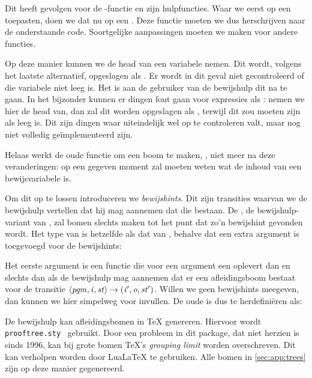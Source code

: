 Dit heeft gevolgen voor de -functie en zijn hulpfuncties. Waar we
eerst  op een  toepasten, doen we dat nu op een .
Deze functie moeten we dus herschrijven naar de onderstaande code. Soortgelijke
aanpassingen moeten we maken voor andere functies.



Op deze manier kunnen we de head van een variabele nemen. Dit wordt, volgens
het laatste alternatief, opgeslagen als . Er wordt in dit
geval niet gecontroleerd of die variabele niet leeg is. Het is aan de gebruiker
van de bewijshulp dit na te gaan. In het bijzonder kunnen er dingen fout gaan
voor expressies als : nemen we hier de head van,
dan zal dit worden opgeslagen als , terwijl dit  zou moeten zijn als  leeg is. Dit zijn dingen waar uiteindelijk wel
op te controleren valt, maar nog niet volledig geïmplementeerd zijn.

\medskip
Helaas werkt de oude functie om een boom te maken, , niet meer na deze
veranderingen: op een gegeven moment zal  moeten weten wat de inhoud
van een bewijsvariabele is.

Om dit op te lossen introduceren we \emph{bewijshints}. Dit zijn transities
waarvan we de bewijshulp vertellen dat hij mag aannemen dat die bestaan. De
, de bewijshulp-variant van , zal bomen slechts maken tot
het punt dat zo'n bewijshint gevonden wordt. Het type van  is
hetzelfde als dat van , behalve dat een extra argument is toegevoegd
voor de bewijshints:



Het eerste argument is een functie die voor een argument  een
 oplevert dan en slechts dan als de bewijshulp mag aannemen
dat er een afleidingsboom bestaat voor de transitie
$\left\langle\mathit{pgm},\mathit{i},\mathit{st}\right\rangle\to\left(\mathit{i}',\mathit{o},\mathit{st}'\right)$. Willen we geen bewijshints meegeven, dan
kunnen we hier simpelweg  voor invullen. De oude 
is dus te herdefiniëren als:



De bewijshulp kan afleidingsbomen in \TeX{} genereren. Hiervoor wordt
\texttt{prooftree.sty}~\cite{prooftree} gebruikt. Door een probleem in dit
package, dat niet herzien is sinds 1996, kan bij grote bomen \TeX{}'s
\emph{grouping limit} worden overschreven. Dit kan verholpen worden door
LuaLaTeX te gebruiken. Alle bomen in \autoref{sec:app:trees} zijn op deze
manier gegenereerd.
